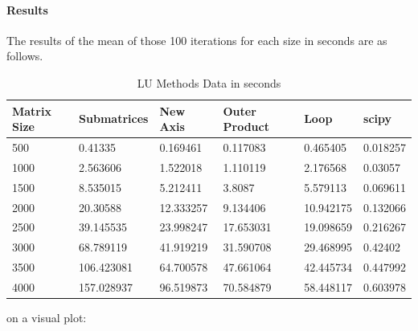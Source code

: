 \paragraph{Results}
The results of the mean of those 100 iterations for each size in seconds are as follows. 
\begin{table}[H]
    \centering
    \begin{tabular}{|l|l|l|l|l|l|}
    \hline
        \textbf{Matrix Size} & \textbf{Submatrices} & \textbf{New Axis} & \textbf{Outer Product} & \textbf{Loop} & \textbf{scipy} \\ \hline
        500 & 0.41335 & 0.169461 & 0.117083 & 0.465405 & 0.018257 \\ \hline
        1000 & 2.563606 & 1.522018 & 1.110119 & 2.176568 & 0.03057 \\ \hline
        1500 & 8.535015 & 5.212411 & 3.8087 & 5.579113 & 0.069611 \\ \hline
        2000 & 20.30588 & 12.333257 & 9.134406 & 10.942175 & 0.132066 \\ \hline
        2500 & 39.145535 & 23.998247 & 17.653031 & 19.098659 & 0.216267 \\ \hline
        3000 & 68.789119 & 41.919219 & 31.590708 & 29.468995 & 0.42402 \\ \hline
        3500 & 106.423081 & 64.700578 & 47.661064 & 42.445734 & 0.447992 \\ \hline
        4000 & 157.028937 & 96.519873 & 70.584879 & 58.448117 & 0.603978 \\ \hline
    \end{tabular}
    \caption{LU Methods Data in seconds}
\end{table}

on a visual plot:

